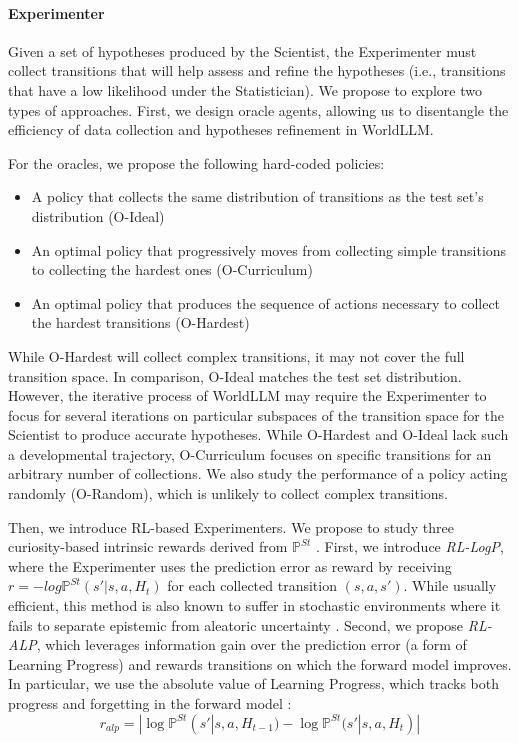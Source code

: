 \documentclass{article}
\begin{document}
\paragraph{Experimenter} \label{sec:worldllm-experimenter-details}
Given a set of hypotheses produced by the Scientist, the Experimenter must collect transitions that will help assess and refine the hypotheses (i.e., transitions that have a low likelihood under the Statistician). We propose to explore two types of approaches. First, we design oracle agents, allowing us to disentangle the efficiency of data collection and hypotheses refinement in WorldLLM.

For the oracles, we propose the following hard-coded policies:
\begin{itemize}
    \item A policy that collects the same distribution of transitions as the test set's distribution (O-Ideal)
    \item An optimal policy that progressively moves from collecting simple transitions to collecting the hardest ones (O-Curriculum)
    \item An optimal policy that produces the sequence of actions necessary to collect the hardest transitions (O-Hardest)
\end{itemize}
While O-Hardest will collect complex transitions, it may not cover the full transition space. In comparison, O-Ideal matches the test set distribution. However, the iterative process of WorldLLM may require the Experimenter to focus for several iterations on particular subspaces of the transition space for the Scientist to produce accurate hypotheses. While O-Hardest and O-Ideal lack such a developmental trajectory, O-Curriculum focuses on specific transitions for an arbitrary number of collections. We also study the performance of a policy acting randomly (O-Random), which is unlikely to collect complex transitions.

Then, we introduce RL-based Experimenters. We propose to study three curiosity-based intrinsic rewards derived from $\mathbb{P}^{St}$ \citep{oudeyer_what_2007}. First, we introduce \textit{RL-LogP}, where the Experimenter uses the prediction error \citep{schmidhuber_curious_1991, pathak_curiosity-driven_2017, burda_large-scale_2018} as reward by receiving $r=-log\mathbb{P}^{St}(s'|s,a,H_t)$ for each collected transition $(s,a,s')$. While usually efficient, this method is also known to suffer in stochastic environments where it fails to separate epistemic from aleatoric uncertainty \citep{burda_exploration_2018}. Second, we propose \textit{RL-ALP}, which leverages information gain over the prediction error (a form of Learning Progress) \citep{oudeyer_what_2007, lopes_exploration_2012, schmidhuber_curious_1991} and rewards transitions on which the forward model improves. In particular, we use the absolute value of Learning Progress, which tracks both progress and forgetting in the forward model \citep{oudeyer_what_2007, baranes_r-iac_2009}:
\begin{equation}
    r_{alp} = |\log\mathbb{P}^{St}(s'|s,a,H_{t-1}) -\log\mathbb{P}^{St}(s'|s,a,H_t)|
    \label{eq:4-worldllm-RL-ALP}
\end{equation} 
\end{document}
